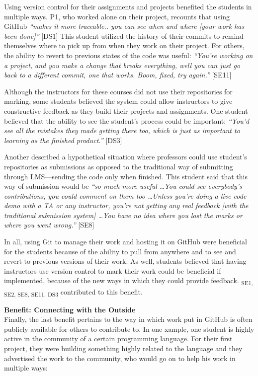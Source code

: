 Using version control for their assignments and projects benefited the students in multiple ways. P1, who worked alone on their project, recounts that using GitHub \textit{``makes it more traceable.. you can see when and where [your work has been done]''} [DS1] This student utilized the history of their commits to remind themselves where to pick up from when they work on their project. For others, the ability to revert to previous states of the code was useful: \textit{``You're working on a project, and you make a change that breaks everything, well you can just go back to a different commit, one that works. Boom, fixed, try again.''} [SE11]

Although the instructors for these courses did not use their repositories for marking, some students believed the system could allow instructors to give constructive feedback as they build their projects and assignments. One student believed that the ability to see the student's process could be important: \textit{``You'd see all the mistakes they made getting there too, which is just as important to learning as the finished product.''} [DS3]

Another described a hypothetical situation where professors could use student's repositories as submissions as opposed to the traditional way of submitting through LMS---sending the code only when finished. This student said that this way of submission would be \textit{``so much more useful \ldots You could see everybody's contributions, you could comment on them too \ldots Unless you're doing a live code demo with a TA or any instructor, you're not getting any real feedback [with the traditional submission system] \ldots You have no idea where you lost the marks or where you went wrong.''} [SE8]

In all, using Git to manage their work and hosting it on GitHub were beneficial for the students because of the ability to pull from anywhere and to see and revert to previous versions of their work. As well, students believed that having instructors use version control to mark their work could be beneficial if implemented, because of the new ways in which they could provide feedback. \textsubscript{SE1, SE2, SE8, SE11, DS3} contributed to this benefit.

\textbf{Benefit: Connecting with the Outside} \\
Finally, the last benefit pertains to the way in which work put in GitHub is often publicly available for others to contribute to. In one xample, one student is highly active in the community of a certain programming language. For their first project, they were building something highly related to the language and they advertised the work to the community, who would go on to help his work in multiple ways:

